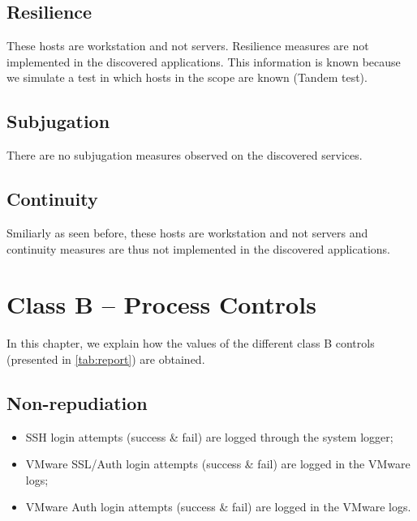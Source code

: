 \documentclass[10pt,a4paper,twoside,onecolumn]{article}
\begin{document}
\subsection{Resilience}

These hosts are workstation and not servers. Resilience measures are not implemented in the discovered applications. This information is known because we simulate a test in which hosts in the scope are known (Tandem test).

\subsection{Subjugation}

There are no subjugation measures observed on the discovered services.

\subsection{Continuity}

Smiliarly as seen before, these hosts are workstation and not servers and continuity measures are thus not implemented in the discovered applications.


\section{Class B -- Process Controls}

In this chapter, we explain how the values of the different class B controls (presented in \autoref{tab:report}) are obtained.

\subsection{Non-repudiation}

\begin{itemize}
	\setlength{\itemsep}{-3mm}
	\item SSH login attempts (success \& fail) are logged through the system logger;
	\item VMware SSL/Auth login attempts (success \& fail) are logged in the VMware logs;
	\item VMware Auth login attempts (success \& fail) are logged in the VMware logs.
\end{itemize}
\end{document}
